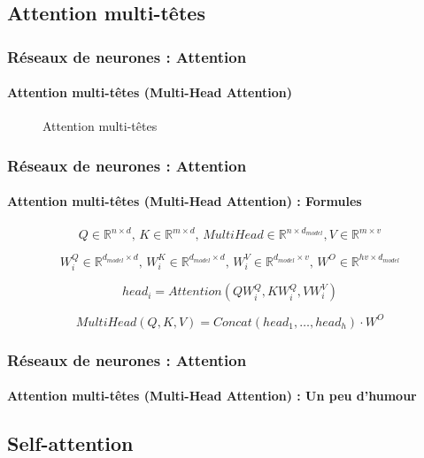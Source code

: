 \documentclass[xcolor=table]{beamer}
\begin{document}
\subsection{Attention multi-têtes}

\begin{frame}
	\frametitle{Réseaux de neurones : Attention}
	\framesubtitle{Attention multi-têtes (Multi-Head Attention)}
	\begin{figure}
		\centering
		
		\vskip-12pt
		\caption{Attention multi-têtes \cite{2017-vaswani-al}}
	\end{figure}
	
\end{frame}

\begin{frame}
	\frametitle{Réseaux de neurones : Attention}
	\framesubtitle{Attention multi-têtes (Multi-Head Attention) : Formules}
	
	\[Q \in \mathbb{R}^{n \times d}, \, K \in \mathbb{R}^{m \times d}, \, MultiHead \in \mathbb{R}^{n \times d_{model}}, V \in \mathbb{R}^{m \times v} \]
	
	\[W^Q_i \in \mathbb{R}^{d_{model} \times d}, \,  W^K_i \in \mathbb{R}^{d_{model} \times d}, \, W^V_i \in \mathbb{R}^{d_{model} \times v}, \, W^O \in \mathbb{R}^{hv \times d_{model}}\]
	
	\[head_i = Attention(Q W^Q_i, K W^Q_i, V W^V_i)\]
	
	\[MultiHead(Q, K, V) = Concat(head_1, \ldots, head_h) \cdot W^O\]
	
	
\end{frame}

\begin{frame}
	\frametitle{Réseaux de neurones : Attention}
	\framesubtitle{Attention multi-têtes (Multi-Head Attention) : Un peu d'humour}
	
	\begin{center}
	\end{center}
	
\end{frame}



\subsection{Self-attention}
\end{document}
